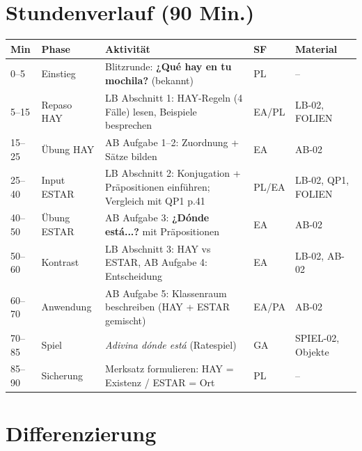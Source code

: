 \documentclass[11pt,a4paper]{article}
\newcommand{\es}[1]{\textbf{#1}}
\begin{document}
\vspace{0.5cm}

\section*{Stundenverlauf (90 Min.)}

\begin{tabular}{|p{1cm}|p{2.2cm}|p{6.5cm}|p{1cm}|p{2.5cm}|}
\hline
\textbf{Min} & \textbf{Phase} & \textbf{Aktivität} & \textbf{SF} & \textbf{Material} \\
\hline
0--5 & Einstieg & Blitzrunde: \es{¿Qué hay en tu mochila?} (bekannt) & PL & -- \\
\hline
5--15 & Repaso HAY & LB Abschnitt 1: HAY-Regeln (4 Fälle) lesen, Beispiele besprechen & EA/PL & LB-02, FOLIEN \\
\hline
15--25 & Übung HAY & AB Aufgabe 1--2: Zuordnung + Sätze bilden & EA & AB-02 \\
\hline
25--40 & Input ESTAR & LB Abschnitt 2: Konjugation + Präpositionen einführen; Vergleich mit QP1 p.41 & PL/EA & LB-02, QP1, FOLIEN \\
\hline
40--50 & Übung ESTAR & AB Aufgabe 3: \es{¿Dónde está...?} mit Präpositionen & EA & AB-02 \\
\hline
50--60 & Kontrast & LB Abschnitt 3: HAY vs ESTAR, AB Aufgabe 4: Entscheidung & EA & LB-02, AB-02 \\
\hline
60--70 & Anwendung & AB Aufgabe 5: Klassenraum beschreiben (HAY + ESTAR gemischt) & EA/PA & AB-02 \\
\hline
70--85 & Spiel & \textit{Adivina dónde está} (Ratespiel) & GA & SPIEL-02, Objekte \\
\hline
85--90 & Sicherung & Merksatz formulieren: HAY = Existenz / ESTAR = Ort & PL & -- \\
\hline
\end{tabular}

\vspace{0.5cm}

\section*{Differenzierung}
\end{document}
